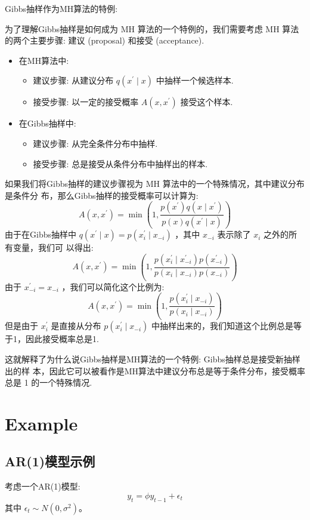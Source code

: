 \documentclass[UTF8,12pt]{ctexart}
\numberwithin{equation}{section}%
\begin{document}
	Gibbs抽样作为MH算法的特例:
	
	为了理解Gibbs抽样是如何成为 $\mathrm{MH}$ 算法的一个特例的，我们需要考虑 $\mathrm{MH}$ 算法的两个主要步骤: 建议 (proposal) 和接受 (acceptance).
	\begin{itemize}
		\item 在MH算法中:
		\begin{itemize}
			\item 建议步骤: 从建议分布 $q\left(x^{\prime} \mid x\right)$ 中抽样一个候选样本.
			\item 接受步骤: 以一定的接受概率 $A\left(x, x^{\prime}\right)$ 接受这个样本.
		\end{itemize}
		\item 在Gibbs抽样中:
		\begin{itemize}
			\item 建议步骤: 从完全条件分布中抽样.
			\item 接受步骤: 总是接受从条件分布中抽样出的样本.
		\end{itemize}
	\end{itemize}
	如果我们将Gibbs抽样的建议步骤视为 $\mathrm{MH}$ 算法中的一个特殊情况，其中建议分布是条件分 布，那么Gibbs抽样的接受概率可以计算为:
	$$
	A\left(x, x^{\prime}\right)=\min \left(1, \frac{p\left(x^{\prime}\right) q\left(x \mid x^{\prime}\right)}{p(x) q\left(x^{\prime} \mid x\right)}\right)
	$$
	由于在Gibbs抽样中 $q\left(x^{\prime} \mid x\right)=p\left(x_i^{\prime} \mid x_{-i}\right)$ ，其中 $x_{-i}$ 表示除了 $x_i$ 之外的所有变量，我们可 以得出:
	$$
	A\left(x, x^{\prime}\right)=\min \left(1, \frac{p\left(x_i^{\prime} \mid x_{-i}^{\prime}\right) p\left(x_{-i}^{\prime}\right)}{p\left(x_i \mid x_{-i}\right) p\left(x_{-i}\right)}\right)
	$$
	由于 $x_{-i}^{\prime}=x_{-i}$ ，我们可以简化这个比例为:
	$$
	A\left(x, x^{\prime}\right)=\min \left(1, \frac{p\left(x_i^{\prime} \mid x_{-i}\right)}{p\left(x_i \mid x_{-i}\right)}\right)
	$$
	但是由于 $x_i^{\prime}$ 是直接从分布 $p\left(x_i^{\prime} \mid x_{-i}\right)$ 中抽样出来的，我们知道这个比例总是等于1，因此接受概率总是1.
	
	这就解释了为什么说Gibbs抽样是MH算法的一个特例: Gibbs抽样总是接受新抽样出的样 本，因此它可以被看作是MH算法中建议分布总是等于条件分布，接受概率总是 1 的一个特殊情况.
	
	\section{Example}
	\subsection{AR(1)模型示例}
	考虑一个AR(1)模型:
	\[ y_t = \phi y_{t-1} + \epsilon_t \]
	其中 \( \epsilon_t \sim N(0, \sigma^2) \)。
	
\end{document}
